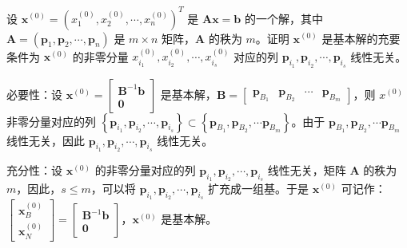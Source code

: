 

\newcommand\Title{最优化方法第4次作业}




\begin{problem}
    设 $\boldsymbol{x}^{(0)} = (x_1^{(0)}, x_2^{(0)}, \cdots, x_n^{(0)})^T$ 是 $\boldsymbol{A}\boldsymbol{x} = \boldsymbol{b}$ 的一个解，其中 $\boldsymbol{A} = (\boldsymbol{p}_1, \boldsymbol{p}_2, \cdots, \boldsymbol{p}_n)$ 是 $m\times n$ 矩阵，$\boldsymbol{A}$ 的秩为 $m$。证明 $\boldsymbol{x}^{(0)}$ 是基本解的充要条件为 $\boldsymbol{x}^{(0)}$ 的非零分量 $x_{i_1}^{(0)}, x_{i_2}^{(0)}, \cdots, x_{i_s}^{(0)}$ 对应的列 $\boldsymbol{p}_{i_1}, \boldsymbol{p}_{i_2}, \cdots, \boldsymbol{p}_{i_s}$ 线性无关。
\end{problem}
\begin{solution}
    必要性：设 $\boldsymbol{x}^{(0)} = \begin{bmatrix}
        \boldsymbol{B}^{-1}\boldsymbol{b} \\
        \boldsymbol{0}
    \end{bmatrix}$ 是基本解，$\boldsymbol{B} = \begin{bmatrix}
        \boldsymbol{p}_{B_1} & \boldsymbol{p}_{B_2} & \cdots & \boldsymbol{p}_{B_m} 
    \end{bmatrix}$，则 $x^{(0)}$ 非零分量对应的列 $\left\{\boldsymbol{p}_{i_1}, \boldsymbol{p}_{i_2}, \cdots, \boldsymbol{p}_{i_s}\right\} \subset \left\{\boldsymbol{p}_{B_1}, \boldsymbol{p}_{B_2}, \cdots  \boldsymbol{p}_{B_m} \right\}$。由于 $\boldsymbol{p}_{B_1}, \boldsymbol{p}_{B_2}, \cdots  \boldsymbol{p}_{B_m}$ 线性无关，因此 $\boldsymbol{p}_{i_1}, \boldsymbol{p}_{i_2}, \cdots, \boldsymbol{p}_{i_s}$ 线性无关。

    充分性：设 $\boldsymbol{x}^{(0)}$ 的非零分量对应的列 $\boldsymbol{p}_{i_1}, \boldsymbol{p}_{i_2}, \cdots, \boldsymbol{p}_{i_s}$ 线性无关，矩阵 $\boldsymbol{A}$ 的秩为 $m$，因此，$s \le m$，可以将 $\boldsymbol{p}_{i_1}, \boldsymbol{p}_{i_2}, \cdots, \boldsymbol{p}_{i_s}$ 扩充成一组基。于是 $\boldsymbol{x}^{(0)}$ 可记作：$\begin{bmatrix}
        \boldsymbol{x}_B^{(0)} \\
        \boldsymbol{x}_N^{(0)}
    \end{bmatrix} = \begin{bmatrix}
        \boldsymbol{B}^{-1}\boldsymbol{b} \\
        \boldsymbol{0}
    \end{bmatrix}$，$\boldsymbol{x}^{(0)}$ 是基本解。
\end{solution}

